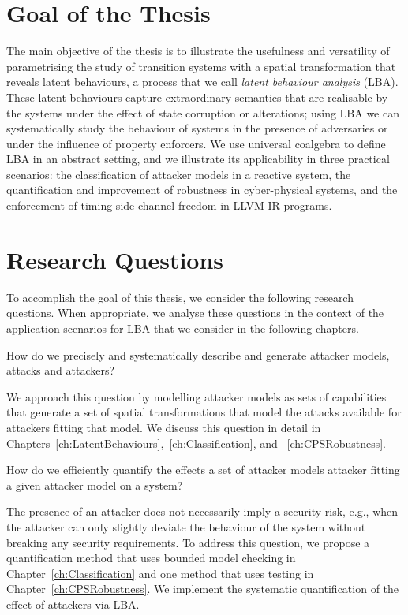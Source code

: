 
\section{Goal of the Thesis}
\label{sec:Introduction:Goal}
The main objective of the thesis is to illustrate the usefulness and versatility of parametrising the study of transition systems with a spatial transformation that reveals latent behaviours, a process that we call \emph{latent behaviour analysis} (LBA). These latent behaviours capture extraordinary semantics that are realisable by the systems under the effect of state corruption or alterations; using LBA we can systematically study the behaviour of systems in the presence of adversaries or under the influence of property enforcers. We use universal coalgebra to define LBA in an abstract setting, and we illustrate its applicability in three practical scenarios: the classification of attacker models in a reactive system, the quantification and improvement of robustness in cyber-physical systems, and the enforcement of timing side-channel freedom in LLVM-IR programs. 

\section{Research Questions}
\label{sec:Introduction:ResearchQuestions}
To accomplish the goal of this thesis, we consider the following research questions. When appropriate, we analyse these questions in the context of the application scenarios for LBA that we consider in the following chapters. 
\begin{question}
\label{que:AttackerModel}
How do we precisely and systematically describe and generate attacker models, attacks and attackers?
\end{question}
We approach this question by modelling attacker models as sets of capabilities that generate a set of spatial transformations that model the attacks available for attackers fitting that model. We discuss this question in detail in Chapters~\ref{ch:LatentBehaviours},~\ref{ch:Classification}, and ~\ref{ch:CPSRobustness}.
\begin{question}
\label{que:Quantification}
How do we efficiently quantify the effects a set of attacker models attacker fitting a given attacker model on a system? 
\end{question}
The presence of an attacker does not necessarily imply a security risk, e.g., when the attacker can only slightly deviate the behaviour of the system without breaking any security requirements. To address this question, we propose a quantification method that uses bounded model checking in Chapter~\ref{ch:Classification} and one method that uses testing in Chapter~\ref{ch:CPSRobustness}. We implement the systematic quantification of the effect of attackers via LBA. 

